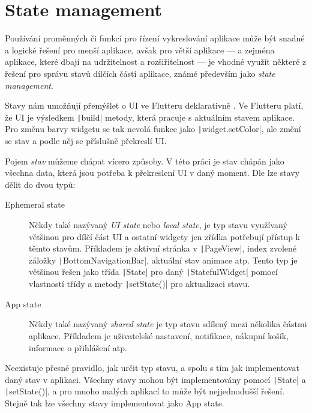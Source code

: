 \section{State management}

Používání proměnných či funkcí pro řízení vykreslování aplikace může být
snadné a logické řešení pro menší aplikace,
avšak pro větší aplikace
--- a zejména aplikace, které dbají na udržitelnost a rozšiřitelnost ---
je vhodné využít některé z řešení pro správu stavů dílčích částí aplikace,
známé především jako \emph{state management}.

Stavy nám umožňují přemýšlet o UI ve Flutteru deklarativně
\cite{flutter_state_mgmt_declarative}.
Ve Flutteru platí,
že UI je výsledkem \texttt|build| metody,
která pracuje s aktuálním stavem aplikace.
Pro změnu barvy widgetu se tak nevolá funkce jako
\texttt|widget.setColor|,
ale změní se stav a podle něj se příslušně překreslí UI.

Pojem \emph{stav} můžeme chápat vícero způsoby.
V této práci je stav chápán jako všechna data,
která jsou potřeba k překreslení UI v daný moment.
Dle \cite{flutter_state_mgmt_ephemeral_vs_app} lze stavy dělit do dvou typů:

\begin{description}
    \item[Ephemeral state] Někdy také nazývaný \emph{UI state} nebo
    \emph{local state},
    je typ stavu využívaný většinou pro dílčí část UI
    a ostatní widgety jen zřídka potřebují přístup k těmto stavům.
    Příkladem je aktivní stránka v \texttt|PageView|,
    index zvolené záložky \texttt|BottomNavigationBar|,
    aktuální stav animace atp.
    Tento typ je většinou řešen jako třída \texttt|State| pro daný
    \texttt|StatefulWidget| pomocí vlastností třídy a metody
    \texttt|setState()| pro aktualizaci stavu.
    \item[App state] Někdy také nazývaný \emph{shared state} je typ stavu
    sdílený mezi několika částmi aplikace.
    Příkladem je uživatelské nastavení, notifikace, nákupní košík,
    informace o přihlášení atp.
\end{description}

Neexistuje přesné pravidlo,
jak určit typ stavu,
a spolu s tím jak implementovat daný stav v aplikaci.
Všechny stavy mohou být implementovány pomocí \texttt|State| a
\texttt|setState()|,
a pro mnoho malých aplikací to může být nejjednodušší řešení.
Stejně tak lze všechny stavy implementovat jako App state.
\cite{flutter_state_mgmt_ephemeral_vs_app}

